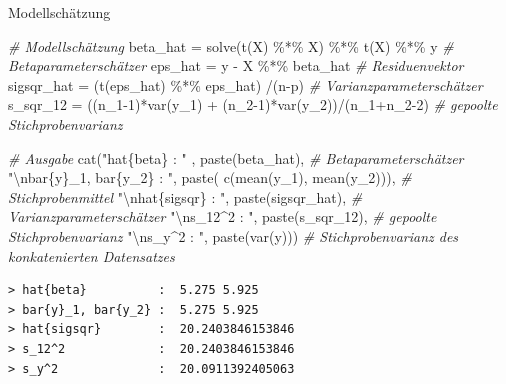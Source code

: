 \documentclass[
  8pt,
  ignorenonframetext,
]{beamer}
\newenvironment{Shaded}{\begin{snugshade}}{\end{snugshade}}
\newcommand{\CommentTok}[1]{\textcolor[rgb]{0.56,0.35,0.01}{\textit{#1}}}
\newcommand{\DecValTok}[1]{\textcolor[rgb]{0.00,0.00,0.81}{#1}}
\newcommand{\FunctionTok}[1]{\textcolor[rgb]{0.00,0.00,0.00}{#1}}
\newcommand{\NormalTok}[1]{#1}
\newcommand{\OtherTok}[1]{\textcolor[rgb]{0.56,0.35,0.01}{#1}}
\newcommand{\SpecialCharTok}[1]{\textcolor[rgb]{0.00,0.00,0.00}{#1}}
\newcommand{\StringTok}[1]{\textcolor[rgb]{0.31,0.60,0.02}{#1}}
\begin{document}
\begin{frame}[fragile]{Modellschätzung}
\begin{Shaded}
\begin{Highlighting}[]
\CommentTok{\# Modellschätzung}
\NormalTok{beta\_hat   }\OtherTok{=} \FunctionTok{solve}\NormalTok{(}\FunctionTok{t}\NormalTok{(X) }\SpecialCharTok{\%*\%}\NormalTok{ X) }\SpecialCharTok{\%*\%} \FunctionTok{t}\NormalTok{(X) }\SpecialCharTok{\%*\%}\NormalTok{ y                     }\CommentTok{\# Betaparameterschätzer}
\NormalTok{eps\_hat    }\OtherTok{=}\NormalTok{ y }\SpecialCharTok{{-}}\NormalTok{ X }\SpecialCharTok{\%*\%}\NormalTok{ beta\_hat                                   }\CommentTok{\# Residuenvektor}
\NormalTok{sigsqr\_hat }\OtherTok{=}\NormalTok{ (}\FunctionTok{t}\NormalTok{(eps\_hat) }\SpecialCharTok{\%*\%}\NormalTok{ eps\_hat) }\SpecialCharTok{/}\NormalTok{(n}\SpecialCharTok{{-}}\NormalTok{p)                      }\CommentTok{\# Varianzparameterschätzer}
\NormalTok{s\_sqr\_12   }\OtherTok{=}\NormalTok{ ((n\_1}\DecValTok{{-}1}\NormalTok{)}\SpecialCharTok{*}\FunctionTok{var}\NormalTok{(y\_1) }\SpecialCharTok{+}\NormalTok{ (n\_2}\DecValTok{{-}1}\NormalTok{)}\SpecialCharTok{*}\FunctionTok{var}\NormalTok{(y\_2))}\SpecialCharTok{/}\NormalTok{(n\_1}\SpecialCharTok{+}\NormalTok{n\_2}\DecValTok{{-}2}\NormalTok{)    }\CommentTok{\# gepoolte Stichprobenvarianz}

\CommentTok{\# Ausgabe}
\FunctionTok{cat}\NormalTok{(}\StringTok{"hat\{beta\}          : "}\NormalTok{  , }\FunctionTok{paste}\NormalTok{(beta\_hat),                   }\CommentTok{\# Betaparameterschätzer}
    \StringTok{"}\SpecialCharTok{\textbackslash{}n}\StringTok{bar\{y\}\_1, bar\{y\_2\} : "}\NormalTok{, }\FunctionTok{paste}\NormalTok{( }\FunctionTok{c}\NormalTok{(}\FunctionTok{mean}\NormalTok{(y\_1), }\FunctionTok{mean}\NormalTok{(y\_2))),   }\CommentTok{\# Stichprobenmittel}
    \StringTok{"}\SpecialCharTok{\textbackslash{}n}\StringTok{hat\{sigsqr\}        : "}\NormalTok{, }\FunctionTok{paste}\NormalTok{(sigsqr\_hat),                 }\CommentTok{\# Varianzparameterschätzer}
    \StringTok{"}\SpecialCharTok{\textbackslash{}n}\StringTok{s\_12\^{}2             : "}\NormalTok{, }\FunctionTok{paste}\NormalTok{(s\_sqr\_12),                   }\CommentTok{\# gepoolte Stichprobenvarianz}
    \StringTok{"}\SpecialCharTok{\textbackslash{}n}\StringTok{s\_y\^{}2              : "}\NormalTok{, }\FunctionTok{paste}\NormalTok{(}\FunctionTok{var}\NormalTok{(y)))                     }\CommentTok{\# Stichprobenvarianz des konkatenierten Datensatzes}
\end{Highlighting}
\end{Shaded}

\begin{verbatim}
> hat{beta}          :  5.275 5.925 
> bar{y}_1, bar{y_2} :  5.275 5.925 
> hat{sigsqr}        :  20.2403846153846 
> s_12^2             :  20.2403846153846 
> s_y^2              :  20.0911392405063
\end{verbatim}
\end{frame}
\end{document}
